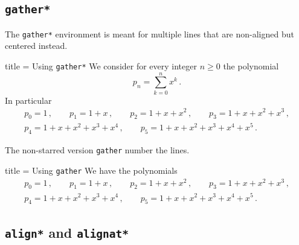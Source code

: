 \documentclass[a4paper, 10pt, headings=standardclasses, oneside, bibliography=totocnumbered]{scrbook}
\begin{document}



\subsection{\texttt{gather*}}

The \texttt{gather*} environment is meant for multiple lines that are non-aligned but centered instead.
\begin{tcblisting}{title = {Using \texttt{gather*}}}
We consider for every integer $n \geq 0$ the polynomial
\[
  p_n
  =
  \sum_{k=0}^n x^k \,.
\]
In particular
\begin{gather*}
  p_0 = 1 \,,
  \qquad
  p_1 = 1 + x \,,
  \qquad
  p_2 = 1 + x + x^2 \,,
  \qquad
  p_3 = 1 + x + x^2 + x^3 \,,
  \\
  p_4 = 1 + x + x^2 + x^3 + x^4 \,,
  \qquad
  p_5 = 1 + x + x^2 + x^3 + x^4 + x^5 \,.
\end{gather*}
\end{tcblisting}
The non-starred version \texttt{gather} number the lines.
\begin{tcblisting}{title = {Using \texttt{gather}}}
We have the polynomials
\begin{gather}
  p_0 = 1 \,,
  \qquad
  p_1 = 1 + x \,,
  \qquad
  p_2 = 1 + x + x^2 \,,
  \qquad
  p_3 = 1 + x + x^2 + x^3 \,,
  \\
  p_4 = 1 + x + x^2 + x^3 + x^4 \,,
  \qquad
  p_5 = 1 + x + x^2 + x^3 + x^4 + x^5 \,.
\end{gather}
\end{tcblisting}



\subsection{\texttt{align*} and \texttt{alignat*}}
\end{document}
